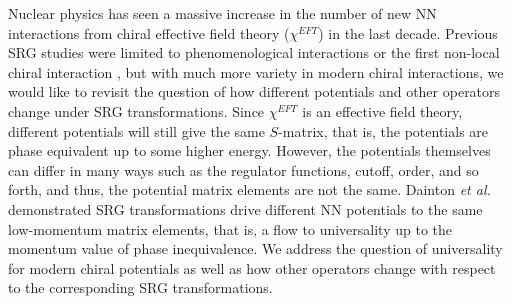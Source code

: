 \documentclass[preprintnumbers,floatfix,aps,prc,preprint,nofootinbib]{revtex4-1}
\begin{document}

Nuclear physics has seen a massive increase in the number of new NN interactions from chiral effective field theory ($\chi^{EFT}$) in the last decade. Previous SRG studies were limited to phenomenological interactions or the first non-local chiral interaction \cite{Entem:2003ft}, but with much more variety in modern chiral interactions, we would like to revisit the question of how different potentials and other operators change under SRG transformations. Since $\chi^{EFT}$ is an effective field theory, different potentials will still give the same $S$-matrix, that is, the potentials are phase equivalent up to some higher energy. However, the potentials themselves can differ in many ways such as the regulator functions, cutoff, order, and so forth, and thus, the potential matrix elements are not the same. Dainton \textit{et al.}~\cite{Dainton:2013axa} demonstrated SRG transformations drive different NN potentials to the same low-momentum matrix elements, that is, a flow to universality up to the momentum value of phase inequivalence. We address the question of universality for modern chiral potentials as well as how other operators change with respect to the corresponding SRG transformations.
\\
\end{document}
